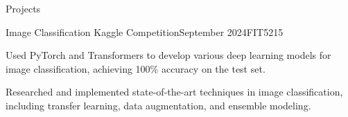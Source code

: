 \documentclass[
	10pt, %
]{resume} %
\let\orighref\href
\renewcommand{\href}[2]{\orighref{#1}{#2\,\faExternalLink}}
\begin{document}
\begin{rSection}{Projects}

	\begin{rSubsection}{Image Classification Kaggle Competition}{September 2024}{FIT5215}{}
		\item Used PyTorch and Transformers to develop various deep learning models for image classification, achieving 100\% accuracy on the test set.
		\item Researched and implemented state-of-the-art techniques in image classification, including transfer learning, data augmentation, and ensemble modeling.
	\end{rSubsection}







\end{rSection}
\end{document}
